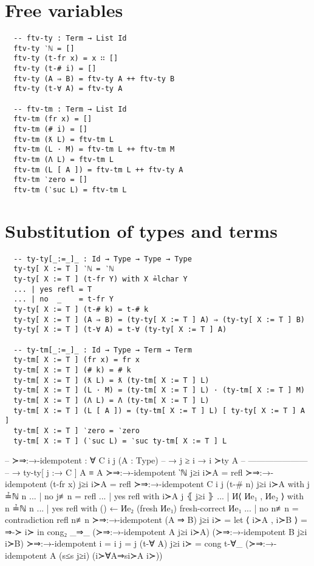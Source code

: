 \documentclass[logo,bsc,singlespacing,parskip,online]{infthesis}
\begin{document}
\section{Free variables}
\label{appendix:f_free_variables}
\begin{verbatim}
  -- ftv-ty : Term → List Id
  ftv-ty ‵ℕ = []
  ftv-ty (t-fr x) = x ∷ []
  ftv-ty (t-# i) = []
  ftv-ty (A ⇒ B) = ftv-ty A ++ ftv-ty B
  ftv-ty (t-∀ A) = ftv-ty A

  -- ftv-tm : Term → List Id
  ftv-tm (fr x) = []
  ftv-tm (# i) = []
  ftv-tm (ƛ L) = ftv-tm L
  ftv-tm (L · M) = ftv-tm L ++ ftv-tm M
  ftv-tm (Λ L) = ftv-tm L
  ftv-tm (L [ A ]) = ftv-tm L ++ ftv-ty A
  ftv-tm ‵zero = []
  ftv-tm (‵suc L) = ftv-tm L
\end{verbatim}

\section{Substitution of types and terms}
\label{appendix:f_substitution_of_terms}
\begin{verbatim}
  -- ty-ty[_:=_]_ : Id → Type → Type → Type
  ty-ty[ X := T ] ‵ℕ = ‵ℕ
  ty-ty[ X := T ] (t-fr Y) with X ≟lchar Y
  ... | yes refl = T
  ... | no  _    = t-fr Y
  ty-ty[ X := T ] (t-# k) = t-# k
  ty-ty[ X := T ] (A ⇒ B) = (ty-ty[ X := T ] A) ⇒ (ty-ty[ X := T ] B)
  ty-ty[ X := T ] (t-∀ A) = t-∀ (ty-ty[ X := T ] A)

  -- ty-tm[_:=_]_ : Id → Type → Term → Term
  ty-tm[ X := T ] (fr x) = fr x
  ty-tm[ X := T ] (# k) = # k
  ty-tm[ X := T ] (ƛ L) = ƛ (ty-tm[ X := T ] L)
  ty-tm[ X := T ] (L · M) = (ty-tm[ X := T ] L) · (ty-tm[ X := T ] M)
  ty-tm[ X := T ] (Λ L) = Λ (ty-tm[ X := T ] L)
  ty-tm[ X := T ] (L [ A ]) = (ty-tm[ X := T ] L) [ ty-ty[ X := T ] A ]
  ty-tm[ X := T ] ‵zero = ‵zero
  ty-tm[ X := T ] (‵suc L) = ‵suc ty-tm[ X := T ] L
\end{verbatim}

\begin{code}
  -- ≻⇒:→-idempotent : ∀ {C i j} (A : Type)
  --   → j ≥ i       → i ≻ty A
  --     ---------------------
  --   → ty-ty[ j :→ C ] A ≡ A
  ≻⇒:→-idempotent ‵ℕ j≥i i≻A = refl
  ≻⇒:→-idempotent (t-fr x) j≥i i≻A = refl
  ≻⇒:→-idempotent {C} {i} {j} (t-# n) j≥i i≻A with j ≟ℕ n
  ... | no  j≢n  = refl
  ... | yes refl with i≻A j ⦃ j≥i ⦄
  ...   | И⟨ Иe₁ , Иe₂ ⟩ with n ≟ℕ n
  ...     | yes refl with () ← Иe₂ (fresh Иe₁) {fresh-correct Иe₁}
  ...     | no  n≢n  = contradiction refl n≢n
  ≻⇒:→-idempotent (A ⇒ B) j≥i i≻ = let ⟨ i≻A , i≻B ⟩ = ⇒-≻ i≻
    in cong₂ _⇒_ (≻⇒:→-idempotent A j≥i i≻A) (≻⇒:→-idempotent B j≥i i≻B)
  ≻⇒:→-idempotent {i = i} {j = j} (t-∀ A) j≥i i≻ = cong t-∀_
    (≻⇒:→-idempotent A (s≤s j≥i) (i≻∀A⇒si≻A i≻))
\end{code}
\end{document}
